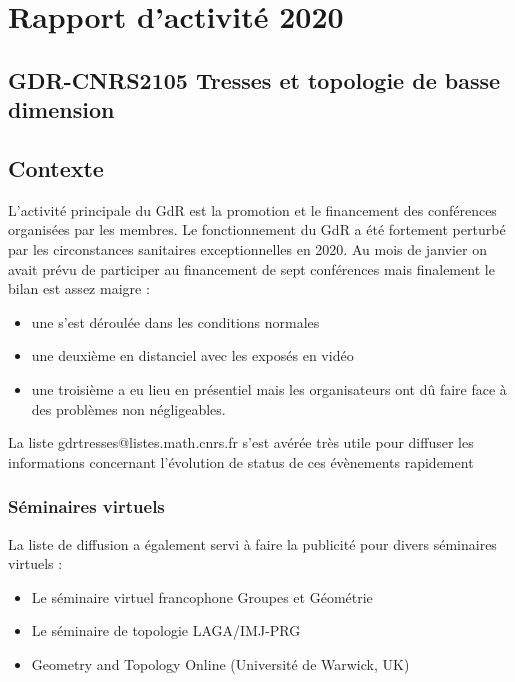 \documentclass[]{article}
\date{}
\providecommand{\tightlist}{%
  \setlength{\itemsep}{0pt}\setlength{\parskip}{0pt}}
\begin{document}
\section{Rapport d'activité 2020}\label{rapport-dactivituxe9-2020}

\subsection{GDR-CNRS2105 Tresses et topologie de basse
dimension}\label{gdr-cnrs2105-tresses-et-topologie-de-basse-dimension}

\subsection{Contexte}\label{contexte}

L'activité principale du GdR est la promotion et le financement des
conférences organisées par les membres. Le fonctionnement du GdR a été
fortement perturbé par les circonstances sanitaires exceptionnelles en 2020. Au
mois de janvier on avait prévu de participer au financement de sept
conférences mais finalement le bilan est assez maigre :

\begin{itemize}
\tightlist
\item
  une s'est déroulée dans les conditions normales
\item
  une deuxième en distanciel avec les exposés en vidéo
\item
  une troisième a eu lieu en présentiel mais les organisateurs ont dû
  faire face à des problèmes non négligeables.
\end{itemize}

La liste gdrtresses@listes.math.cnrs.fr s'est avérée très utile pour
diffuser les informations concernant l'évolution de status de ces évènements rapidement

\subsubsection{Séminaires virtuels}\label{suxe9minaires-virtuels}

La liste de diffusion a également servi à faire la publicité pour divers
séminaires virtuels :

\begin{itemize}
\tightlist
\item
  Le séminaire virtuel francophone Groupes et Géométrie
\item
  Le séminaire de topologie LAGA/IMJ-PRG
\item
  Geometry and Topology Online (Université de Warwick, UK)
\end{itemize}
\end{document}

